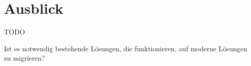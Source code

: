 \section{Ausblick}
\label{sec:ausblick}

TODO

Ist es notwendig bestehende Lösungen, die funktionieren, auf moderne Lösungen zu migrieren?